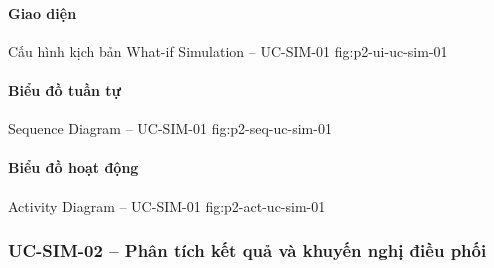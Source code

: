 \par\medskip
\noindent\begin{minipage}{\linewidth}
\paragraph{Giao diện}
  {Cấu hình kịch bản What-if Simulation -- UC-SIM-01}
  {fig:p2-ui-uc-sim-01}
  {}
\end{minipage}\par

\clearpage
\paragraph{Biểu đồ tuần tự}

  {Sequence Diagram -- UC-SIM-01}
  {fig:p2-seq-uc-sim-01}

\clearpage
\paragraph{Biểu đồ hoạt động}

  {Activity Diagram -- UC-SIM-01}
  {fig:p2-act-uc-sim-01}

\clearpage

\subsubsection{UC-SIM-02 -- Phân tích kết quả và khuyến nghị điều phối}



